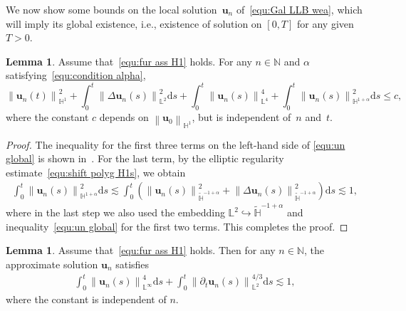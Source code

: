 \documentclass[11pt,reqno]{amsart}
\theoremstyle{definition}
\newtheorem{lemma}[theorem]{Lemma}
\numberwithin{equation}{section}
\newcommand{\bff}{\boldsymbol}
\newcommand{\bb}{\mathbb}
\newcommand{\ds}{\mathrm{d}s}
\newcommand{\pa}{\partial}
\newcommand{\norm}[2]{\left\|{#1}\right\|_{#2}}
\begin{document}
We now show some bounds on the local solution~$\bff{u}_n$
of~\eqref{equ:Gal LLB wea}, which will imply its global existence, i.e., existence of solution on $[0,T]$ for any given $T>0$.

\begin{lemma}\label{lem:ene est 1 llb}
	Assume that~\eqref{equ:fur ass H1} holds. For any $n\in \bb{N}$ and $\alpha$ satisfying~\eqref{equ:condition alpha},
\begin{equation}\label{equ:un global}
\norm{\bff{u}_n(t)}{\bb{H}^1}^2
+
\int_0^t \norm{\Delta\bff{u}_n(s)}{\bb{L}^2}^2 \ds
+
\int_0^t 
\norm{\bff{u}_n(s)}{\bb{L}^4}^4
+
\int_0^t \norm{\bff{u}_n(s)}{\bb{H}^{1+\alpha}}^2 \ds
\le c,
\end{equation}
where the constant $c$ depends on $\norm{\bff{u}_0}{\bb{H}^1}$, but is independent of~$n$ and~$t$.
\end{lemma}

\begin{proof}
The inequality for the first three terms on the left-hand side of \eqref{equ:un global} is shown in~\citep[Lemma~3.2]{Le16}. For the last term, by the elliptic regularity estimate~\eqref{equ:shift polyg H1s}, we obtain
\begin{align*}
    \int_0^t \norm{\bff{u}_n(s)}{\bb{H}^{1+\alpha}}^2 \ds
	\lesssim
	\int_0^t \left(\norm{\bff{u}_n(s)}{\widetilde{\bb{H}}^{-1+\alpha}}^2 + \norm{\Delta \bff{u}_n(s)}{\widetilde{\bb{H}}^{-1+\alpha}}^2 \right) \ds
	\lesssim 1,
\end{align*}
where in the last step we also used the embedding $\bb{L}^2\hookrightarrow \widetilde{\bb{H}}^{-1+\alpha}$ and inequality~\eqref{equ:un global} for the first two terms. This completes the proof.
\end{proof}



\begin{lemma}
Assume that~\eqref{equ:fur ass H1} holds.
Then for any $n\in \bb{N}$, the approximate solution $\bff{u}_n$ satisfies
\begin{align}\label{equ:dt un 43}
	\int_0^t \norm{\bff{u}_n(s)}{\bb{L}^\infty}^4 \ds
	+
	\int_0^t \norm{\pa_t \bff{u}_n(s)}{\bb{L}^2}^{4/3} \ds \lesssim 1,
\end{align}
where the constant is independent of $n$.
\end{lemma}
\end{document}
